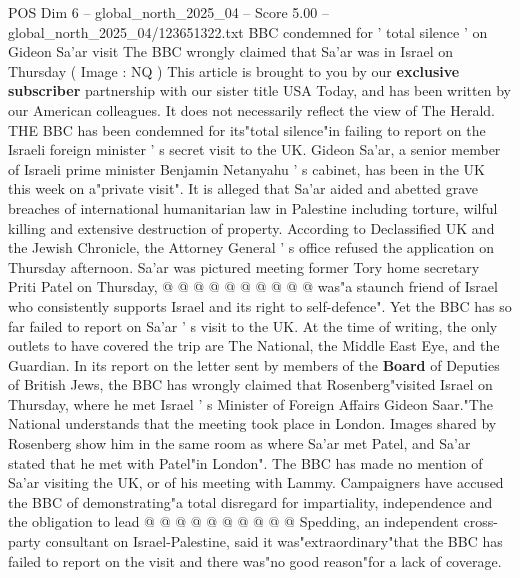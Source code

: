 \begin{textsample}{POS Dim 6 – global\_north\_2025\_04 – Score 5.00 – global\_north\_2025\_04/123651322.txt}  \label{ex:f6_pos_193}
BBC condemned for ' total silence ' on Gideon Sa'ar visit The BBC wrongly claimed that Sa'ar was in Israel on Thursday ( Image : NQ ) This article is brought to you by our \textbf{exclusive} \textbf{subscriber} partnership with our sister title USA Today, and has been written by our American colleagues.
It does not necessarily reflect the view of The Herald.
THE BBC has been condemned for its"total silence"in failing to report on the Israeli foreign minister ' s secret visit to the UK.
Gideon Sa'ar, a senior member of Israeli prime minister Benjamin Netanyahu ' s cabinet, has been in the UK this week on a"private visit".
It is alleged that Sa'ar aided and abetted grave breaches of international humanitarian law in Palestine including torture, wilful killing and extensive destruction of property.
According to Declassified UK and the Jewish Chronicle, the Attorney General ' s office refused the application on Thursday afternoon.
Sa'ar was pictured meeting former Tory home secretary Priti Patel on Thursday, @ @ @ @ @ @ @ @ @ @ was"a staunch friend of Israel who consistently supports Israel and its right to self-defence".
Yet the BBC has so far failed to report on Sa'ar ' s visit to the UK.
At the time of writing, the only outlets to have covered the trip are The National, the Middle East Eye, and the Guardian.
In its report on the letter sent by members of the \textbf{Board} of Deputies of British Jews, the BBC has wrongly claimed that Rosenberg"visited Israel on Thursday, where he met Israel ' s Minister of Foreign Affairs Gideon Saar."The National understands that the meeting took place in London.
Images shared by Rosenberg show him in the same room as where Sa'ar met Patel, and Sa'ar stated that he met with Patel"in London".
The BBC has made no mention of Sa'ar visiting the UK, or of his meeting with Lammy.
Campaigners have accused the BBC of demonstrating"a total disregard for impartiality, independence and the obligation to lead @ @ @ @ @ @ @ @ @ @ Spedding, an independent cross-party consultant on Israel-Palestine, said it was"extraordinary"that the BBC has failed to report on the visit and there was"no good reason"for a lack of coverage.

\end{textsample}
